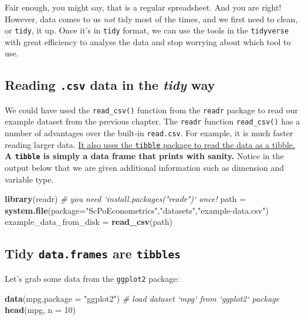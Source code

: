 \documentclass[]{book}
\newenvironment{Shaded}{\begin{snugshade}}{\end{snugshade}}
\newcommand{\KeywordTok}[1]{\textcolor[rgb]{0.13,0.29,0.53}{\textbf{#1}}}
\newcommand{\DataTypeTok}[1]{\textcolor[rgb]{0.13,0.29,0.53}{#1}}
\newcommand{\DecValTok}[1]{\textcolor[rgb]{0.00,0.00,0.81}{#1}}
\newcommand{\StringTok}[1]{\textcolor[rgb]{0.31,0.60,0.02}{#1}}
\newcommand{\CommentTok}[1]{\textcolor[rgb]{0.56,0.35,0.01}{\textit{#1}}}
\newcommand{\NormalTok}[1]{#1}
\theoremstyle{definition}
\theoremstyle{definition}
\theoremstyle{definition}
\theoremstyle{remark}
\begin{document}
Fair enough, you might say, that is a regular spreadsheet. And you are
right! However, data comes to us \emph{not} tidy most of the times, and
we first need to clean, or \texttt{tidy}, it up. Once it's in
\texttt{tidy} format, we can use the tools in the \texttt{tidyverse}
with great efficiency to analyse the data and stop worrying about which
tool to use.

\subsection{\texorpdfstring{Reading \texttt{.csv} data in the
\emph{tidy}
way}{Reading .csv data in the tidy way}}\label{reading-.csv-data-in-the-tidy-way}

We could have used the \texttt{read\_csv()} function from the
\texttt{readr} package to read our example dataset from the previous
chapter. The \texttt{readr} function \texttt{read\_csv()} has a number
of advantages over the built-in \texttt{read.csv}. For example, it is
much faster reading larger data.
\href{https://cran.r-project.org/web/packages/tibble/vignettes/tibble.html}{It
also uses the \texttt{tibble} package to read the data as a tibble.}
\textbf{A \texttt{tibble} is simply a data frame that prints with
sanity.} Notice in the output below that we are given additional
information such as dimension and variable type.

\begin{Shaded}
\begin{Highlighting}[]
\KeywordTok{library}\NormalTok{(readr)  }\CommentTok{# you need `install.packages("readr")` once!}
\NormalTok{path =}\StringTok{ }\KeywordTok{system.file}\NormalTok{(}\DataTypeTok{package=}\StringTok{"ScPoEconometrics"}\NormalTok{,}\StringTok{"datasets"}\NormalTok{,}\StringTok{"example-data.csv"}\NormalTok{)}
\NormalTok{example_data_from_disk =}\StringTok{ }\KeywordTok{read_csv}\NormalTok{(path)}
\end{Highlighting}
\end{Shaded}

\subsection{\texorpdfstring{Tidy \texttt{data.frames} are
\texttt{tibbles}}{Tidy data.frames are tibbles}}\label{tidy-data.frames-are-tibbles}

Let's grab some data from the \texttt{ggplot2} package:

\begin{Shaded}
\begin{Highlighting}[]
\KeywordTok{data}\NormalTok{(mpg,}\DataTypeTok{package =} \StringTok{"ggplot2"}\NormalTok{)  }\CommentTok{# load dataset `mpg` from `ggplot2` package}
\KeywordTok{head}\NormalTok{(mpg, }\DataTypeTok{n =} \DecValTok{10}\NormalTok{)}
\end{Highlighting}
\end{Shaded}
\end{document}
